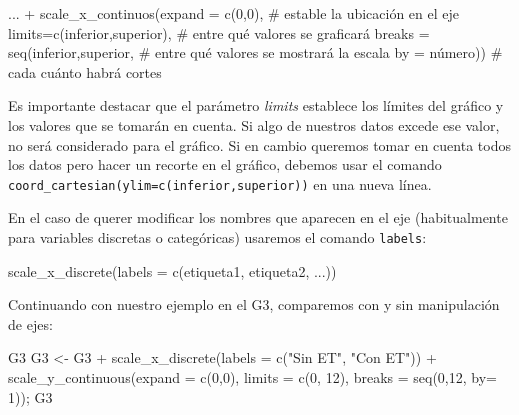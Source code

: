 \documentclass[
  letterpaper,
  DIV=11,
  numbers=noendperiod]{scrartcl}
\newenvironment{Shaded}{\begin{snugshade}}{\end{snugshade}}
\newcommand{\AttributeTok}[1]{\textcolor[rgb]{0.40,0.45,0.13}{#1}}
\newcommand{\CommentTok}[1]{\textcolor[rgb]{0.37,0.37,0.37}{#1}}
\newcommand{\DecValTok}[1]{\textcolor[rgb]{0.68,0.00,0.00}{#1}}
\newcommand{\FunctionTok}[1]{\textcolor[rgb]{0.28,0.35,0.67}{#1}}
\newcommand{\NormalTok}[1]{\textcolor[rgb]{0.00,0.23,0.31}{#1}}
\newcommand{\OtherTok}[1]{\textcolor[rgb]{0.00,0.23,0.31}{#1}}
\newcommand{\SpecialCharTok}[1]{\textcolor[rgb]{0.37,0.37,0.37}{#1}}
\newcommand{\StringTok}[1]{\textcolor[rgb]{0.13,0.47,0.30}{#1}}
\begin{document}
\begin{Shaded}
\begin{Highlighting}[]
\NormalTok{  ... }\SpecialCharTok{+}
  \FunctionTok{scale\_x\_continuos}\NormalTok{(}\AttributeTok{expand =} \FunctionTok{c}\NormalTok{(}\DecValTok{0}\NormalTok{,}\DecValTok{0}\NormalTok{), }\CommentTok{\# estable la ubicación en el eje}
                    \AttributeTok{limits=}\FunctionTok{c}\NormalTok{(inferior,superior), }\CommentTok{\# entre qué valores se graficará}
                    \AttributeTok{breaks =} \FunctionTok{seq}\NormalTok{(inferior,superior, }\CommentTok{\# entre qué valores se mostrará la escala}
                                 \AttributeTok{by =}\NormalTok{ número)) }\CommentTok{\# cada cuánto habrá cortes}
\end{Highlighting}
\end{Shaded}

Es importante destacar que el parámetro \emph{limits} establece los
límites del gráfico y los valores que se tomarán en cuenta. Si algo de
nuestros datos excede ese valor, no será considerado para el gráfico. Si
en cambio queremos tomar en cuenta todos los datos pero hacer un recorte
en el gráfico, debemos usar el comando
\texttt{coord\_cartesian(ylim=c(inferior,superior))} en una nueva línea.

En el caso de querer modificar los nombres que aparecen en el eje
(habitualmente para variables discretas o categóricas) usaremos el
comando \texttt{labels}:

\begin{Shaded}
\begin{Highlighting}[]
\FunctionTok{scale\_x\_discrete}\NormalTok{(}\AttributeTok{labels =} \FunctionTok{c}\NormalTok{(etiqueta1, etiqueta2, ...))}
\end{Highlighting}
\end{Shaded}

Continuando con nuestro ejemplo en el G3, comparemos con y sin
manipulación de ejes:

\begin{Shaded}
\begin{Highlighting}[]
\NormalTok{G3}
\NormalTok{G3 }\OtherTok{\textless{}{-}}\NormalTok{ G3 }\SpecialCharTok{+} \FunctionTok{scale\_x\_discrete}\NormalTok{(}\AttributeTok{labels =} \FunctionTok{c}\NormalTok{(}\StringTok{"Sin ET"}\NormalTok{, }\StringTok{"Con ET"}\NormalTok{)) }\SpecialCharTok{+}
  \FunctionTok{scale\_y\_continuous}\NormalTok{(}\AttributeTok{expand =} \FunctionTok{c}\NormalTok{(}\DecValTok{0}\NormalTok{,}\DecValTok{0}\NormalTok{), }
                     \AttributeTok{limits =} \FunctionTok{c}\NormalTok{(}\DecValTok{0}\NormalTok{, }\DecValTok{12}\NormalTok{), }
                     \AttributeTok{breaks =} \FunctionTok{seq}\NormalTok{(}\DecValTok{0}\NormalTok{,}\DecValTok{12}\NormalTok{, }\AttributeTok{by=} \DecValTok{1}\NormalTok{)); G3}
\end{Highlighting}
\end{Shaded}
\end{document}
